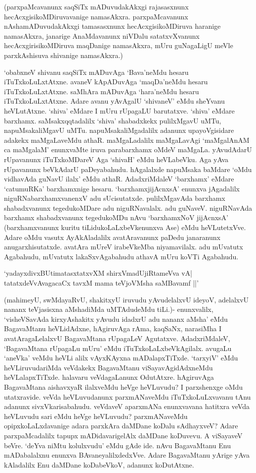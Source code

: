 (parxpaMcavanunx saqSiTx mADuvudakAkxgi rajasasxnunx hecAcxgisikoMDiruvavanige namasAkxra. parxpaMcavanunx nAshamADuvudakAkxgi tamasasxnunx hecAcxgisikoMDiruva haranige namasAkxra, janarige AnaMdavanunx niVDalu satatxvXvanunx hecAcxgirisikoMDiruva maqDanige namasAkxra, mUru guNagaLigU meVle parxkAshisuva shivanige namasAkxra.)


`obabxneV shivanu saqSiTx mADuvAga `Bava'neMdu hesaru iTuTxkoLuLxtAtxne. avaneV kApADuvAga `maqDa'neMdu hesaru iTuTxkoLuLxtAtxne. saMhAra mADuvAga `hara'neMdu hesaru iTuTxkoLuLxtAtxne. Adare avanu yAvAgalU `shivaneV' eMdu sheYvanu heVLutAtxne. `shiva' eMdare I mUru rUpagaLU barutatxve. `shiva' eMdare barxhamx. saMsakxqqtadalilx `shiva' shabadxkekx pulilxMgavU uMTu, napuMsakaliMgavU uMTu. napuMsakaliMgadalilx adanunx upayoVgisidare adakekx maMgaLaveMdu athaR. maMgaLadalilx maMgaLavAgi `maMgalAnAM ca maMgalaM' enunxvaMte iruva parabarxhamx oMdeV maMgaLa. yAvudAdarU rUpavanunx iTuTxkoMDareV Aga `shivaH' eMdu heVLabeVku. Aga yAva rUpavanunx beVkAdarU paDeyabahudu. hAgalalxde napuMsaka baMdare `oMdu vidhavAda guNavU ilalx' eMdu athaR. AdadxriMdaleV `barxhamx' eMdare `catumuRKa' barxhamxnige hesaru. `barxhamxjijAcnxsA' enunxva jAgadalilx niguRNabarxhamxvanenxV adu sUcisutatxde. pulilxMgavAda barxhamx shabadxvanunx tegedukoMDare adu niguRNavalalx. adu guNaveV. niguRNavAda barxhamx shabadxvanunx tegedukoMDu nAvu `barxhamxNoV jijAcnxsA' (barxhamxvanunx kuritu tiLidukoLaLxbeVkenunxva Ase) eMdu heVLutetxVve. Adare oMdu vasutx AyAkAladalilx avatAravanunx paDedu janaranunx anugarxhisutatxde. avatAra mUreV irabeVkeMba niyamavilalx. adu mUvatutx Agabahudu, mUvatutx lakaSxvAgabahudu athavA mUru koVTi Agabahudu.

\begin{shloka}
`yadayxdivxBUtimatasxtatxvXM shirxVmadUjiRtameVva vA‌|\\
tatatxdeVvAvagacaCx tavxM mama teVjoVMsha saMBavamf ||'
\end{shloka}

(mahimeyU, swMdayaRvU, shakitxyU iruvudu yAvudelalxvU ideyoV, adelalxvU nananx teVjasisxna aMshadiMda uMTAdudeMdu tiLi.)- enunxvalilx, 
`visheVSavAda kirxyAshakitx yAvudu idadxrU adu nananx aMsha' eMdu BagavaMtanu heVLidAdxne, hAgiruvAga rAma, kaqSaNx, narasiMha I avatAragaLelalxvU BagavaMtana rUpagaLeV Agutatxve. AdadxriMdaleV, `BagavaMtana rUpagaLu mUru' eMdu iTuTxkoLaLxbeVkAgilalx. avugaLu `aneVka' veMdu heVLi alilx vAyxKAyxna mADalapxTiTxde. `tarxyiV' eMdu heVLiruvudariMda veVdakekx BagavaMtanu viSayavAgidAdxneMdu heVLalapxTiTxde. halavaru veVdagaLanunx OdutAtxre. hAgiruvAga BagavaMtana aishavxyaR ilalxveMdu heVge heVLuvudu? I parxshenxge oMdu utatxravide. veVda heVLuvudanunx parxmANaveMdu iTuTxkoLuLxvavanu tAnu adanunx sivxVkarisabahudu. veVdaveV aparxmANa enunxvavana hatitxra veVda heVLuvudu sari eMdu heVge heVLuvudu? parxmANaveMdu opipxkoLaLxdavanige adara parxkAra daMDane koDalu sAdhayxveV? Adare parxpaMcadalilx tapupx mADidavarigelAlx daMDane koDuvevu. A viSayaveV beVre. `deYva niMtu kolulxvudu' eMdu gAde ide. nAvu BagavaMtanu Enu mADabalalxnu enunxva BAvaneyalilxdedxVve. Adare BagavaMtanu yArige yAva kAladalilx Enu daMDane koDabeVkoV, adanunx koDutAtxne.


